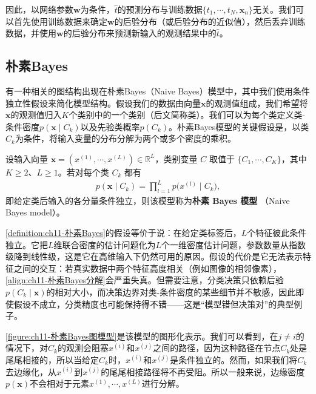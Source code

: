 \documentclass[../../main.tex]{subfiles}
\begin{document}
因此，以网络参数$\mathbf{w}$为条件，$\hat{t}$的预测分布与训练数据$\{t_1,\cdots,t_N,\mathbf{x}_n\}$无关。我们可以首先使用训练数据来确定$\mathbf{w}$的后验分布（或后验分布的近似值），然后丢弃训练数据，并使用$\mathbf{w}$的后验分布来预测新输入的观测结果中的$\hat{t}$。

\subsection{朴素Bayes}\label{subsection:ch11-朴素Bayes}

有一种相关的图结构出现在朴素Bayes（Naive Bayes）模型中，其中我们使用条件独立性假设来简化模型结构。假设我们的数据由向量$\mathbf{x}$的观测值组成，我们希望将$\mathbf{x}$的观测值归入$K$个类别中的一个类别（后文简称类）。我们可以为每个类定义类-条件密度$p(\mathbf{x}\mid C_k)$以及先验类概率$p(C_k)$。朴素Bayes模型的关键假设是，以类$C_k$为条件，将输入变量的分布分解为两个或多个密度的乘积。

\begin{definition}[朴素 Bayes 模型]\label{definition:ch11-朴素Bayes}
设输入向量 $\mathbf{x}=(x^{(1)},\cdots,x^{(L)})\in\mathbb{R}^{L}$，类别变量
$C$ 取值于 $\{C_1,\cdots,C_K\}$，其中 $K\geqslant2$、$L\geqslant1$。若对每个类
$C_k$ 都有
\begin{align}
  p(\mathbf{x}\mid C_k) = \prod_{l=1}^{L}p\bigl(x^{(l)}\mid C_k\bigr),
  \label{align:ch11-朴素Bayes分解}
\end{align}
即给定类后输入的各分量条件独立，则该模型称为\textbf{朴素 Bayes 模型}
（Naive Bayes model）。
\end{definition}

\begin{remark}
\cref{definition:ch11-朴素Bayes}的假设等价于说：在给定类标签后，$L$个特征彼此条件独立。它把$L$维联合密度的估计问题化为$L$个一维密度估计问题，参数数量从指数级降到线性级，这是它在高维输入下仍然可用的原因。假设的代价是它无法表示特征之间的交互：若真实数据中两个特征高度相关（例如图像的相邻像素），\eqref{align:ch11-朴素Bayes分解}会严重失真。但需要注意，分类决策只依赖后验$p(C_k\mid\mathbf{x})$的相对大小，而决策边界对类-条件密度的某些细节并不敏感，因此即使假设不成立，分类精度也可能保持得不错——这是“模型错但决策对”的典型例子。
\end{remark}

\cref{figure:ch11-朴素Bayes图模型}是该模型的图形化表示。我们可以看到，在$j\neq i$的情况下，对$C_k$的观测会阻塞$x^{(i)}$和$x^{(j)}$之间的路径，因为这种路径在节点$C_k$处是尾尾相接的，所以当给定$C_k$时，$x^{(i)}$和$x^{(j)}$是条件独立的。然而，如果我们将$C_k$去边缘化，从$x^{(i)}$到$x^{(j)}$的尾尾相接路径将不再受阻。所以一般来说，边缘密度$p(\mathbf{x})$不会相对于元素$x^{(1)},\cdots,x^{(L)}$进行分解。
\end{document}

